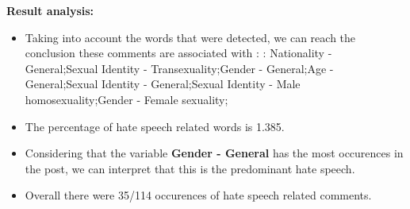 \documentclass[11pt]{article}
\begin{document}
\textbf{\Large Result analysis:}

\begin{itemize}\item Taking into account the words that were detected, we can reach the conclusion these comments are associated with : : Nationality - General;Sexual Identity - Transexuality;Gender - General;Age - General;Sexual Identity - General;Sexual Identity - Male homosexuality;Gender - Female sexuality;%

\item The percentage of hate speech related words is 1.385.

\item Considering that the variable \textbf{Gender - General} has the most occurences in the post, we can interpret that this is the predominant hate speech.

\item Overall there were 35/114 occurences of hate speech related comments.\end{itemize}
\end{document}
